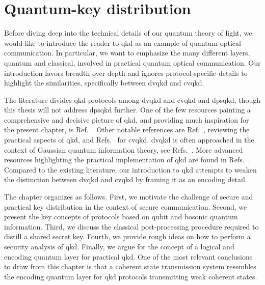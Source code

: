 \chapter{Quantum-key distribution}\label{ch:qkd}

Before diving deep into the technical details of our quantum theory of light, we would like to introduce the reader to \gls{qkd} as an example of quantum optical communication.
In particular, we want to emphasize the many different layers, quantum and classical, involved in practical quantum optical communication.
Our introduction favors breadth over depth and ignores protocol-specific details to highlight the similarities, specifically between \gls{dvqkd} and \gls{cvqkd}.

The literature divides \gls{qkd} protocols among \gls{dvqkd} and \gls{cvqkd} and \gls{dpsqkd}, though this thesis will not address \gls{dpsqkd} further.
One of the few resources painting a comprehensive and decisive picture of \gls{qkd}, and providing much inspiration for the present chapter, is Ref.~\cite{Wolf2021}.
Other notable references are Ref.~\cite{Diamanti2016}, reviewing the practical aspects of \gls{qkd}, and Refs.~\cite{Duvsek2006,Gisin2002} for \gls{cvqkd}.
\gls{dvqkd} is often approached in the context of Gaussian quantum information theory, see Refs.~\cite{Weedbrook2012,Ferraro2005}.
More advanced resources highlighting the practical implementation of \gls{qkd} are found in Refs.~\cite{Scarani2009,Fung2010,Laudenbach2018}.
Compared to the existing literature, our introduction to \gls{qkd} attempts to weaken the distinction between \gls{dvqkd} and \gls{cvqkd} by framing it as an encoding detail.

The chapter organizes as follows. 
First, we motivate the challenge of secure and practical key distribution in the context of secure communication.
Second, we present the key concepts of protocols based on qubit and bosonic quantum information.
Third, we discuss the classical post-processing procedure required to distill a shared secret key.
Fourth, we provide rough ideas on how to perform a security analysis of \gls{qkd}.
Finally, we argue for the concept of a logical and encoding quantum layer for practical \gls{qkd}.
One of the most relevant conclusions to draw from this chapter is that a coherent state transmission system resembles the encoding quantum layer for \gls{qkd} protocols transmitting weak coherent states.